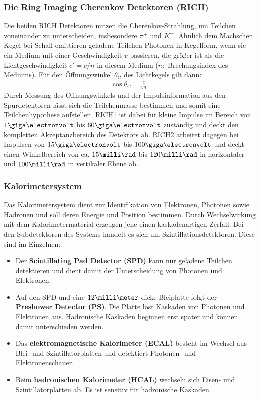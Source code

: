 \subsubsection{Die Ring Imaging Cherenkov Detektoren (RICH)}
Die beiden RICH Detektoren nutzen die Cherenkov-Strahlung, um Teilchen voneinander zu unterscheiden, insbesondere $\pi^{\pm}$ und $K^{\pm}$. Ähnlich dem Machschen Kegel bei Schall emittieren geladene Teilchen Photonen in Kegelform, wenn sie ein Medium mit einer Geschwindigkeit $v$ passieren, die größer ist als die Lichtgeschwindigkeit $c'=c/n$ in diesem Medium ($n:$ Brechungsindex des Mediums). Für den Öffnungswinkel $\theta_{\text{C}}$ des Lichtkegels gilt dann:
\begin{align}
\cos \theta_{\text{C}} = \frac{c}{vn}.
\end{align}
Durch Messung des Öffnungswinkels und der Impulsinformation aus den Spurdetektoren lässt sich die Teilchenmasse bestimmen und somit eine Teilchenhypothese aufstellen. RICH1 ist dabei für kleine Impulse im Bereich von $1\giga\electronvolt$ bis $60\giga\electronvolt$ zuständig und deckt den kompletten Akzeptanzbereich des Detektors ab. RICH2 arbeitet dagegen bei Impulsen von $15\giga\electronvolt$ bis $100\giga\electronvolt$ und deckt einen Winkelbereich von ca. $15\milli\rad$ bis $120\milli\rad$ in horizontaler und $100\milli\rad$ in vertikaler Ebene ab.

\subsubsection{Kalorimetersystem}
Das Kalorimetersystem dient zur Identifikation von Elektronen, Photonen sowie Hadronen und soll deren Energie und Position bestimmen. Durch Wechselwirkung mit dem Kalorimetermaterial erzeugen jene einen kaskadenartigen Zerfall. Bei den Subdetektoren des Systems handelt es sich um Szintillationsdetektoren. Diese sind im Einzelnen:
\begin{itemize}
\item Der \textbf{Scintillating Pad Detector (SPD)} kann nur geladene Teilchen detektieren und dient damit der Unterscheidung von Photonen und Elektronen.
\item Auf den SPD und eine $12\milli\meter$ dicke Bleiplatte folgt der \textbf{Preshower Detector (PS)}. Die Platte löst Kaskaden von Photonen und Elektronen aus. Hadronische Kaskaden beginnen erst später und können damit unterschieden werden.
\item Das \textbf{elektromagnetische Kalorimeter (ECAL)} besteht im Wechsel aus Blei- und Szintillatorplatten und detektiert Photonen- und Elektronenschauer.
\item Beim \textbf{hadronischen Kalorimeter (HCAL)} wechseln sich Eisen- und Szintillatorplatten ab. Es ist sensitiv für hadronische Kaskaden.
\end{itemize}

